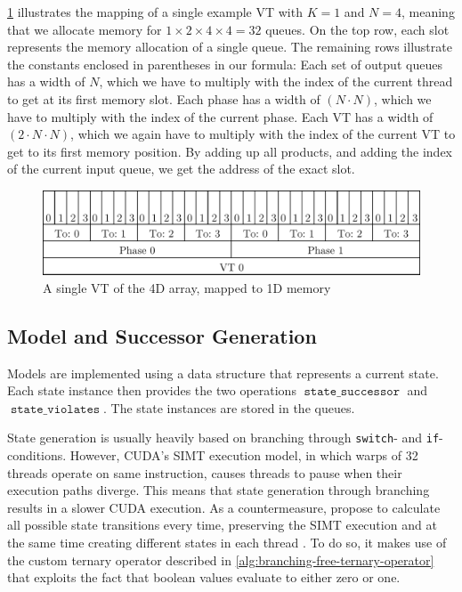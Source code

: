 \documentclass[
fancyheadings, %
%
%
]{stsreprt}
\DeclareMathOperator{\sSuccessor}{\texttt{state\_successor}}
\DeclareMathOperator{\sViolates}{\texttt{state\_violates}}
\begin{document}
\cref{fig:4d-mapped-memory} illustrates the mapping of a single example VT with $K=1$ and $N=4$, meaning that we allocate memory for $1 \times 2 \times 4 \times 4 = 32$ queues.
On the top row, each slot represents the memory allocation of a single queue.
The remaining rows illustrate the constants enclosed in parentheses in our formula:
Each set of output queues has a width of $N$, which we have to multiply with the index of the current thread to get at its first memory slot.
Each phase has a width of $(N \cdot N)$, which we have to multiply with the index of the current phase.
Each VT has a width of $(2 \cdot N \cdot N)$, which we again have to multiply with the index of the current VT to get to its first memory position.
By adding up all products, and adding the index of the current input queue, we get the address of the exact slot.

\begin{figure}
    \includegraphics[width=\textwidth]{figures/4d-mapped-memory}
    \caption{A single VT of the 4D array, mapped to 1D memory}
    \label{fig:4d-mapped-memory}
\end{figure}

\subsection{Model and Successor Generation}

Models are implemented using a data structure that represents a current state.
Each state instance then provides the two operations $\sSuccessor$ and $\sViolates$.
The state instances are stored in the queues.

State generation is usually heavily based on branching through \texttt{switch}- and \texttt{if}-conditions.
However, CUDA's SIMT execution model, in which warps of 32 threads operate on same instruction, causes threads to pause when their execution paths diverge.
This means that state generation through branching results in a slower CUDA execution.
As a countermeasure, \citeauthor*{Bartocci2014.GPGPU-Parallel-SPIN} propose to calculate all possible state transitions every time, preserving the SIMT execution and at the same time creating different states in each thread \cite[Algorithm 3]{Bartocci2014.GPGPU-Parallel-SPIN}.
To do so, it makes use of the custom ternary operator described in \cref{alg:branching-free-ternary-operator} that exploits the fact that boolean values evaluate to either zero or one.
\end{document}
